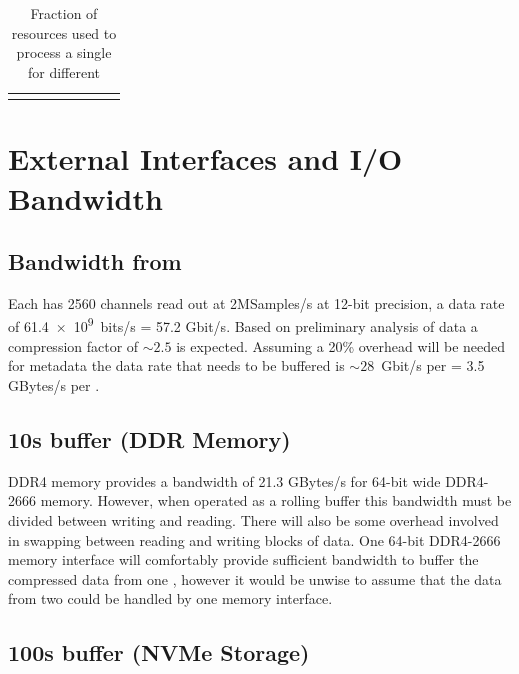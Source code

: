 \documentclass{article}
\begin{document}
\begin{table}[ht]
\begin{tabular}{p{2.2cm} | p{1.5cm} | p{1.3cm} p{1.3cm} | p{1.3cm} p{1.5cm} | p{1.3cm} p{1.5cm}}
\end{tabular}
\caption{Fraction of  resources used to process a single  for different  }
\label{tab:resource_fraction}
\end{table}

\section{External Interfaces and I/O Bandwidth}

\subsection{Bandwidth from }

Each \single {} has 2560 channels read out at 2MSamples/s at 12-bit precision, a data rate of  \SI{61.4e9}{bits/\second} = 57.2 Gbit/s. Based on preliminary analysis of  data\cite{ref:waldron_protodune_compression} a compression factor of $\sim 2.5$ is expected. Assuming a 20\% overhead will be needed for metadata the data rate that needs to be buffered is $\sim 28$~Gbit/s per  = 3.5 GBytes/s per .

\subsection{10s buffer (DDR Memory)}

DDR4 memory provides a bandwidth of 21.3 GBytes/s for 64-bit wide DDR4-2666 memory. However, when operated as a rolling buffer this bandwidth must be divided between writing and reading. There will also be some overhead involved in swapping between reading and writing blocks of data. One 64-bit DDR4-2666 memory interface will comfortably provide sufficient bandwidth to buffer the  compressed data from one  , however it would be unwise to assume that the data from two  could be handled by one memory interface.

\subsection{100s buffer (NVMe Storage)}
\end{document}
